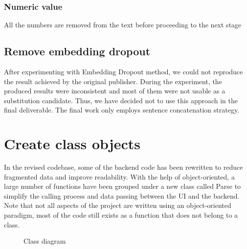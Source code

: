 \documentclass[12pt,oneside,openright,a4paper]{cpe-english-project}
\begin{document}
\subsubsection{Numeric value}
All the numbers are removed from the text before proceeding to the next stage

\subsection{Remove embedding dropout}
After experimenting with Embedding Dropout method, we could not reproduce the result achieved by the original publisher. During the experiment, the produced results were inconsistent and most of them were not usable as a substitution candidate. Thus, we have decided not to use this approach in the final deliverable. The final work only employs sentence concatenation strategy.

\section{Create class objects}
In the revised codebase, some of the backend code has been rewritten to reduce fragmented data and improve readability. With the help of object-oriented, a large number of functions have been grouped under a new class called Parse to simplify the calling process and data passing between the UI and the backend. Note that not all aspects of the project are written using an object-oriented paradigm, most of the code still exists as a function that does not belong to a class. 
\begin{figure}[!h]\centering
\setlength{\fboxrule}{0.2mm} %
\setlength{\fboxsep}{1cm}
\caption{Class diagram}\label{fig:class diagram}
\end{figure}
\end{document}

